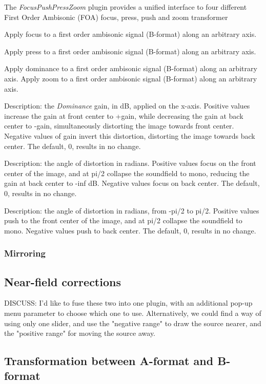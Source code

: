 \documentclass{article}
\begin{document}
The \emph{FocusPushPressZoom} plugin provides a unified interface to four different 
  First Order Ambisonic (FOA) focus, press, push and zoom transformer

Apply focus to a first order ambisonic signal (B-format) along an arbitrary axis.

Apply press to a first order ambisonic signal (B-format) along an arbitrary axis.

Apply dominance to a first order ambisonic signal (B-format) along an arbitrary axis.
Apply zoom to a first order ambisonic signal (B-format) along an arbitrary axis.


Description: the \emph{Dominance} gain, in dB, applied on the x-axis. Positive values increase the gain at front center to +gain, while decreasing the gain at back center to -gain, simultaneously distorting the image towards front center. Negative values of gain invert this distortion, distorting the image towards back center. The default, 0, results in no change.


Description: the angle of distortion in radians. Positive values focus on the front center of the image, and at pi/2 collapse the soundfield to mono, reducing the gain at back center to -inf dB. Negative values focus on back center. The default, 0, results in no change.


Description: the angle of distortion in radians, from -pi/2 to pi/2. Positive values push to the front center of the image, and at pi/2 collapse the soundfield to mono. Negative values push to back center. The default, 0, results in no change.

\subsubsection{Mirroring}\label{sec:mirror}





\subsection{Near-field corrections}\label{sec:near-field}

DISCUSS: I'd like to fuse these two into one plugin, with an additional pop-up menu parameter to choose which one to use. Alternatively, we could find a way of using only one slider, and use the "negative range" to draw the source nearer, and the "positive range" for moving the source away.


\subsection{Transformation between A-format and B-format}\label{sec:a-format}
\end{document}
